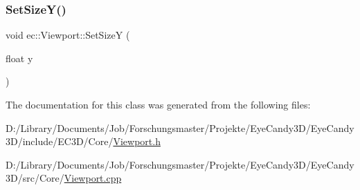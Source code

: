 \subsubsection{\texorpdfstring{Set\+Size\+Y()}{SetSizeY()}}
{\footnotesize\ttfamily void ec\+::\+Viewport\+::\+Set\+SizeY (\begin{DoxyParamCaption}\item[{float}]{y }\end{DoxyParamCaption})}



The documentation for this class was generated from the following files\+:\begin{DoxyCompactItemize}
\item 
D\+:/\+Library/\+Documents/\+Job/\+Forschungsmaster/\+Projekte/\+Eye\+Candy3\+D/\+Eye\+Candy3\+D/include/\+E\+C3\+D/\+Core/\mbox{\hyperlink{_viewport_8h}{Viewport.\+h}}\item 
D\+:/\+Library/\+Documents/\+Job/\+Forschungsmaster/\+Projekte/\+Eye\+Candy3\+D/\+Eye\+Candy3\+D/src/\+Core/\mbox{\hyperlink{_viewport_8cpp}{Viewport.\+cpp}}\end{DoxyCompactItemize}
